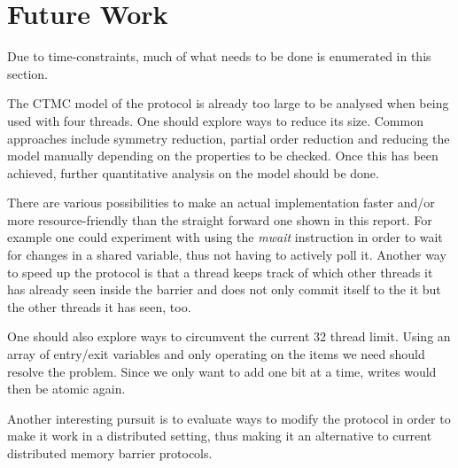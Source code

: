 \documentclass[a4paper, 10pt]{article}
\begin{document}
\section{Future Work}
Due to time-constraints, much of what needs to be done is enumerated in this section.

The CTMC model of the protocol is already too large to be analysed when being used with four threads. One should explore ways to reduce its size. Common approaches include symmetry reduction, partial order reduction and reducing the model manually depending on the properties to be checked. Once this has been achieved, further quantitative analysis on the model should be done.

There are various possibilities to make an actual implementation faster and/or more resource-friendly than the straight forward one shown in this report. For example one could experiment with using the \emph{mwait} instruction in order to wait for changes in a shared variable, thus not having to actively poll it. Another way to speed up the protocol is that a thread keeps track of which other threads it has already seen inside the barrier and does not only commit itself to the it but the other threads it has seen, too.

One should also explore ways to circumvent the current 32 thread limit. Using an array of entry/exit variables and only operating on the items we need should resolve the problem. Since we only want to add one bit at a time, writes would then be atomic again.

Another interesting pursuit is to evaluate ways to modify the protocol in order to make it work in a distributed setting, thus making it an alternative to current distributed memory barrier protocols.

\nocite{*} %

{}
\end{document}
